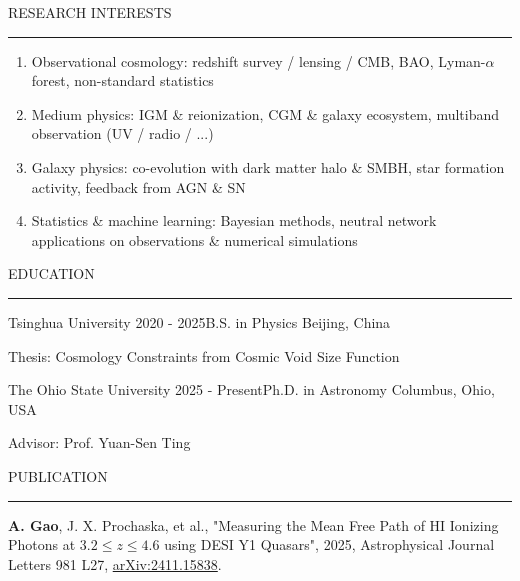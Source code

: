\documentclass{resume} %
\renewenvironment{rSection}[1]{
\sectionskip
\textcolor{TsinghuaPurple}{\MakeUppercase{#1}}
\sectionlineskip
\hrule
\begin{list}{}{
\setlength{\leftmargin}{0em}
}
\item[]
}{
\end{list}
}
\begin{document}
\begin{rSection}{Research INTERESTS}

\begin{enumerate}
    \item Observational cosmology: redshift survey / lensing / CMB, BAO, Lyman-$\alpha$ forest, non-standard statistics 
    \item Medium physics: IGM \& reionization, CGM \& galaxy ecosystem, multiband observation (UV / radio / ...)
    \item Galaxy physics: co-evolution with dark matter halo \& SMBH, star formation activity, feedback from AGN \& SN 
    \item Statistics \& machine learning: Bayesian methods, neutral network applications on observations \& numerical simulations 
\end{enumerate}

\end{rSection}

\begin{rSection}{Education}
    \begin{rSubsection}{Tsinghua University} {2020 - 2025}{B.S. in Physics \hfill \textup{Beijing, China}}{}
        \item Thesis: Cosmology Constraints from Cosmic Void Size Function
    \end{rSubsection}

    \begin{rSubsection}{The Ohio State University} {2025 - Present}{Ph.D. in Astronomy \hfill \textup{Columbus, Ohio, USA}}{}
    \item Advisor: Prof. Yuan-Sen Ting
    \end{rSubsection}

\end{rSection}


\begin{rSection}{Publication}
\textbf{A. Gao}, J. X. Prochaska, et al., "Measuring the Mean Free Path of HI Ionizing Photons at $3.2\leq z\leq4.6$ using DESI Y1 Quasars", 2025, Astrophysical Journal Letters 981 L27, \href{https://arxiv.org/abs/2411.15838}{arXiv:2411.15838}.
\end{rSection}
\end{document}
